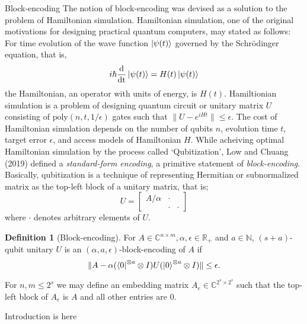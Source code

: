 \documentclass[10pt,twoside,reqno]{amsart} %
\makeatletter
\renewcommand{\section}{\@startsection{section}{1}
   \z@{.7\linespacing\@plus\linespacing}{.5\linespacing}
   {\normalfont\upshape\bfseries\centering}}
\theoremstyle{plain}
\theoremstyle{definition}
\newtheorem{defn}[thm]{Definition}
\makeatother
\begin{document}
\section{Block-encoding}
The notion of block-encoding was devised as a solution to the problem of
Hamiltonian simulation. Hamiltonian simulation, one of the original motivations
for designing practical quantum computers, may stated as follows: For time
evolution of the wave function $\ket{\psi(t)}$ governed by the Schr{\"o}dinger
equation, that is,
\[
  i\hslash\frac{\textrm{d}}{\textrm{dt}}\ket{\psi(t)}
  = H(t)\ket{\psi(t)}
\]
the Hamiltonian, an operator with units of energy, is $H(t)$. Hamiltionian
simulation is a problem of designing quantum circuit or unitary matrix $U$
consisting of $\textrm{poly}(n,t,1/\epsilon)$ gates such that $\|U-{e^{iHt}}\|\leq
\epsilon$. %
The cost of Hamiltonian simulation depends on the number of qubits
$n$, evolution time $t$, target error $\epsilon$, and access models of
Hamiltonian $H$. While acheiving optimal Hamiltonian simulation by the
process called `Qubitization', Low and Chuang (2019) defined a \emph{standard-form
encoding}, a primitive statement of \emph{block-encoding}. Basically, 
qubitization is a technique of representing Hermitian or subnormalized matrix
as the top-left block of a unitary matrix, that is;
\[
  U=\begin{bmatrix}A/\alpha &\cdot \\ &\cdot &\cdot \end{bmatrix}
\]
where $\cdot$ denotes arbitrary elements of $U$. 
\begin{defn}[Block-encoding] For $A\in\mathbb{C}^{n\times m}, \alpha,\epsilon
  \in\mathbb{R}_{+}$ and $a\in\mathbb{N}$, $(s+a)$-qubit unitary $U$ is an
  $(\alpha,a,\epsilon)$-block-encoding of $A$ if
  \[
    \|A-\alpha(\bra0^{\otimes a}\otimes I)U(\ket0^{\otimes a}\otimes I)\|\leq
    \epsilon.
  \]
\end{defn}
For $n,m\leq 2^s$ we may define an embedding matrix $A_e\in
\mathbb{C}^{2^s\times 2^s}$ such that the top-left block of $A_e$ is $A$ and
all other entries are $0$.


Introduction is here
\end{document}
